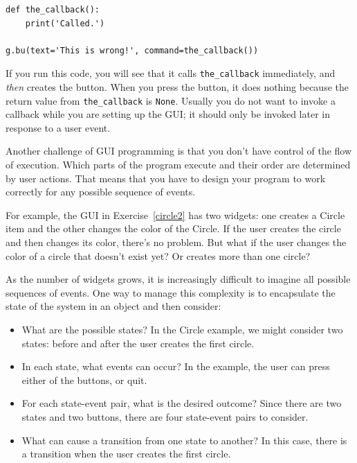 \documentclass[10pt]{book}
\begin{document}
\beforeverb
\begin{verbatim}
def the_callback():
    print('Called.')

g.bu(text='This is wrong!', command=the_callback())
\end{verbatim}
\afterverb
%
If you run this code, you will see that it calls \verb"the_callback"
immediately, and {\em then} creates the button.  When you press the
button, it does nothing because the return value from 
\verb"the_callback" is {\tt None}.
Usually you do not want to invoke a callback while you are
setting up the GUI; it should only be invoked later in response to
a user event.


Another challenge of GUI programming is that you don't have control
of the flow of execution.  Which parts of the program execute
and their order are determined by user actions.
That means that you have to design your program to work correctly
for any possible sequence of events.

For example, the GUI in Exercise~\ref{circle2} has two widgets:
one creates a Circle item and the other changes the color of the
Circle.  If the user creates the circle and then changes its color,
there's no problem.  But what if the user changes the color of
a circle that doesn't exist yet?  Or creates more than one circle?

As the number of widgets grows, it is increasingly difficult to
imagine all possible sequences of events.  One way to manage this 
complexity is to encapsulate the state of the system in an object
and then consider:

\begin{itemize}

\item What are the possible states?  In the Circle example, we
might consider two states: before and after the user creates the
first circle.

\item In each state, what events can occur?  In the example,
the user can press either of the buttons, or quit.

\item For each state-event pair, what is the desired outcome?
Since there are two states and two buttons, there are four
state-event pairs to consider.

\item What can cause a transition from one state to another?
In this case, there is a transition when the user creates
the first circle.

\end{itemize}
\end{document}

